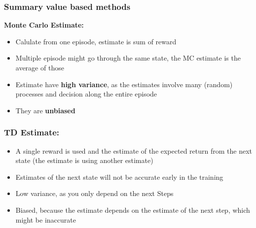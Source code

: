 \subsubsection{Summary value based methods}
\textbf{Monte Carlo Estimate:}
\begin{itemize}
    \item Calulate from one episode, estimate is sum of reward
    \item Multiple episode might go through the same state, the MC estimate is the average of those
    \item Estimate have \textbf{high variance}, as the estimates involve many (random) processes and decision along the entire episode
    \item They are \textbf{unbiased}
\end{itemize}
\subsubsection*{TD Estimate:}
\begin{itemize}
    \item A single reward is used and the estimate of the expected return from the next state (the estimate is using another estimate)
    \item Estimates of the next state will not be accurate early in the training
    \item Low variance, as you only depend on the next Steps
    \item Biased, because the estimate depends on the estimate of the next step, which might be inaccurate
\end{itemize}




